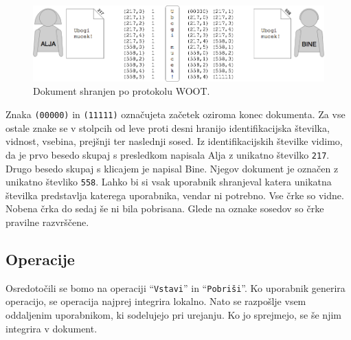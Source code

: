 \documentclass[a4paper, 12pt, twoside]{book}
\begin{document}
\begin{figure}[placement h]
\begin{center}
\includegraphics[width=13cm]{woot2.png}
\end{center}
\caption{Dokument shranjen po protokolu WOOT.}
\label{woot2}
\end{figure}

Znaka {\tt (00000)} in {\tt (11111)} označujeta začetek oziroma konec dokumenta. Za vse ostale znake se v stolpcih od leve proti desni hranijo identifikacijska številka, vidnost, vsebina, prejšnji ter naslednji sosed. Iz identifikacijskih številke vidimo, da je prvo besedo skupaj s presledkom napisala Alja z unikatno številko {\tt 217}. Drugo besedo skupaj s klicajem je napisal Bine. Njegov dokument je označen z unikatno števliko {\tt 558}. Lahko bi si vsak uporabnik shranjeval katera unikatna številka predstavlja katerega uporabnika, vendar ni potrebno. Vse črke so vidne. Nobena črka do sedaj še ni bila pobrisana. Glede na oznake sosedov so črke pravilne razvrščene.

\subsection{Operacije}

Osredotočili se bomo na operaciji “{\tt Vstavi}” in “{\tt Pobriši}”. Ko uporabnik generira operacijo, se operacija najprej integrira lokalno. Nato se razpošlje vsem oddaljenim uporabnikom, ki sodelujejo pri urejanju. Ko jo sprejmejo, se še njim integrira v dokument.
\end{document}
